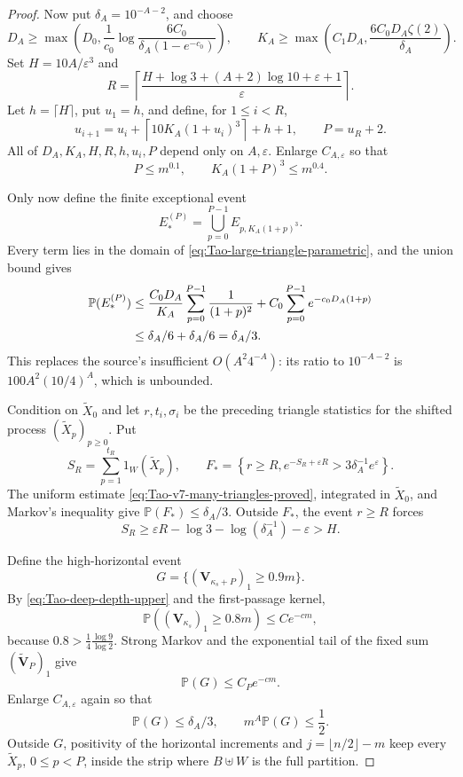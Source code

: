 \begin{proof}
Now put \(\delta_A=10^{-A-2}\), and choose
\[
 D_A\ge\max\left(D_0,
 \frac1{c_0}\log\frac{6C_0}{\delta_A(1-e^{-c_0})}\right),
 \qquad
 K_A\ge\max\left(C_1D_A,
 \frac{6C_0D_A\zeta(2)}{\delta_A}\right).
\]
Set \(H=10A/\varepsilon^3\) and
\[
 R=\left\lceil
 \frac{H+\log3+(A+2)\log10+\varepsilon+1}{\varepsilon}
 \right\rceil.
\]
Let \(h=\lceil H\rceil\), put \(u_1=h\), and define, for
\(1\le i<R\),
\[
 u_{i+1}=u_i+\left\lceil10K_A(1+u_i)^3\right\rceil+h+1,
 \qquad P=u_R+2.
\]
All of \(D_A,K_A,H,R,h,u_i,P\) depend only on \(A,\varepsilon\).  Enlarge
\(C_{A,\varepsilon}\) so that
\begin{equation}
\label{eq:Tao-case3-applicability}
 P\le m^{0.1},\qquad K_A(1+P)^3\le m^{0.4}.
\end{equation}

Only now define the finite exceptional event
\[
 E_*^{(P)}=\bigcup_{p=0}^{P-1}E_{p,K_A(1+p)^3}.
\]
Every term lies in the domain of
\eqref{eq:Tao-large-triangle-parametric}, and the union bound gives
\begin{align}
 \mathbb P(E_*^{(P)})
 &\le \frac{C_0D_A}{K_A}
       \sum_{p=0}^{P-1}\frac1{(1+p)^2}
   +C_0\sum_{p=0}^{P-1}e^{-c_0D_A(1+p)}\notag\\
 &\le\delta_A/6+\delta_A/6=\delta_A/3.
 \label{eq:Tao-E-star-budget}
\end{align}
This replaces the source's insufficient
\(O(A^2 4^{-A})\): its ratio to \(10^{-A-2}\) is
\(100A^2(10/4)^A\), which is unbounded.

Condition on \(\widetilde X_0\) and let \(r,t_i,\sigma_i\) be the preceding
triangle statistics for the shifted process \((\widetilde X_p)_{p\ge0}\).
Put
\[
 S_R=\sum_{p=1}^{t_R}1_W(\widetilde X_p),\qquad
 F_*=\left\{r\ge R,
 e^{-S_R+\varepsilon R}>3\delta_A^{-1}e^\varepsilon\right\}.
\]
The uniform estimate \eqref{eq:Tao-v7-many-triangles-proved}, integrated in
\(\widetilde X_0\), and Markov's inequality give
\(\mathbb P(F_*)\le\delta_A/3\).  Outside \(F_*\), the event \(r\ge R\)
forces
\[
 S_R\ge\varepsilon R-\log3-\log(\delta_A^{-1})-\varepsilon>H.
\]

Define the high-horizontal event
\[
 G=\{(\mathbf V_{\kappa_s+P})_1\ge0.9m\}.
\]
By \eqref{eq:Tao-deep-depth-upper} and the first-passage kernel,
\[
 \mathbb P((\mathbf V_{\kappa_s})_1\ge0.8m)\le Ce^{-cm},
\]
because \(0.8>\frac14\frac{\log9}{\log2}\).  Strong Markov and the
exponential tail of the fixed sum
\((\widetilde{\mathbf V}_P)_1\) give
\[
 \mathbb P(G)\le C_Pe^{-cm}.
\]
Enlarge \(C_{A,\varepsilon}\) again so that
\begin{equation}
\label{eq:Tao-G-budget}
 \mathbb P(G)\le\delta_A/3,
 \qquad m^A\mathbb P(G)\le\frac12.
\end{equation}
Outside \(G\), positivity of the horizontal increments and
\(j=\lfloor n/2\rfloor-m\) keep every
\(\widetilde X_p\), \(0\le p<P\), inside the strip where
\(B\uplus W\) is the full partition.


\end{proof}

